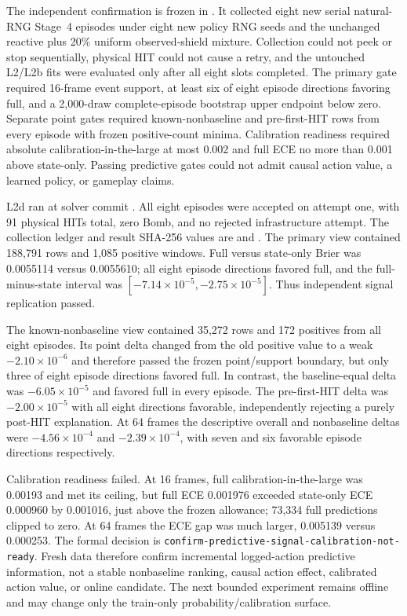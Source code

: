 \documentclass[11pt]{article}
\begin{document}
The independent confirmation is frozen in
.  It collected eight
new serial natural-RNG Stage~4 episodes under eight new policy RNG seeds and
the unchanged reactive plus 20\% uniform observed-shield mixture.  Collection
could not peek or stop sequentially, physical HIT could not cause a retry, and
the untouched L2/L2b fits were evaluated only after all eight slots completed.
The primary gate required 16-frame event support, at least six of eight episode
directions favoring full, and a 2,000-draw complete-episode bootstrap upper
endpoint below zero.  Separate point gates required known-nonbaseline and
pre-first-HIT rows from every episode with frozen positive-count minima.
Calibration readiness required absolute calibration-in-the-large at most
0.002 and full ECE no more than 0.001 above state-only.  Passing predictive
gates could not admit causal action value, a learned policy, or gameplay claims.

L2d ran at solver commit
.  All eight episodes were
accepted on attempt one, with 91 physical HITs total, zero Bomb, and no rejected
infrastructure attempt.  The collection ledger and result SHA-256 values are
and
.
The primary view contained 188,791 rows and 1,085 positive windows.  Full versus
state-only Brier was 0.0055114 versus 0.0055610; all eight episode directions
favored full, and the full-minus-state interval was
$[-7.14\times10^{-5},-2.75\times10^{-5}]$.  Thus independent signal
replication passed.

The known-nonbaseline view contained 35,272 rows and 172 positives from all
eight episodes.  Its point delta changed from the old positive value to a weak
$-2.10\times10^{-6}$ and therefore passed the frozen point/support boundary,
but only three of eight episode directions favored full.  In contrast, the
baseline-equal delta was $-6.05\times10^{-5}$ and favored full in every
episode.  The pre-first-HIT delta was $-2.00\times10^{-5}$ with all eight
directions favorable, independently rejecting a purely post-HIT explanation.
At 64 frames the descriptive overall and nonbaseline deltas were
$-4.56\times10^{-4}$ and $-2.39\times10^{-4}$, with seven and six favorable
episode directions respectively.

Calibration readiness failed.  At 16 frames, full calibration-in-the-large
was 0.00193 and met its ceiling, but full ECE 0.001976 exceeded state-only ECE
0.000960 by 0.001016, just above the frozen allowance; 73,334 full predictions
clipped to zero.  At 64 frames the ECE gap was much larger, 0.005139 versus
0.000253.  The formal decision is
\texttt{confirm-predictive-signal-calibration-not-ready}.  Fresh data therefore
confirm incremental logged-action predictive information, not a stable
nonbaseline ranking, causal action effect, calibrated action value, or online
candidate.  The next bounded experiment remains offline and may change only
the train-only probability/calibration surface.
\end{document}
